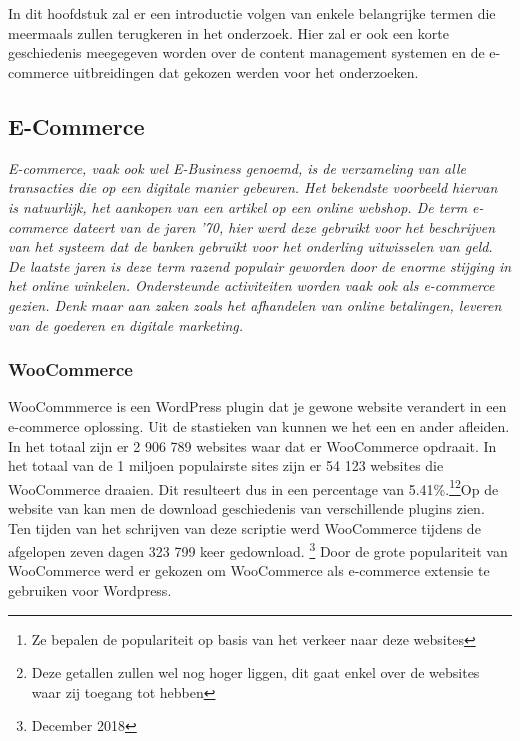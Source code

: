 \chapter{}
\label{ch:stand-van-zaken}


In dit hoofdstuk zal er een introductie volgen van enkele belangrijke termen die meermaals zullen terugkeren in het onderzoek. Hier zal er ook een korte geschiedenis meegegeven worden over de content management systemen en de e-commerce uitbreidingen dat gekozen werden voor het onderzoeken.
\section{E-Commerce}
\textit{E-commerce, vaak ook wel E-Business genoemd, is de verzameling van alle transacties die op een digitale manier gebeuren. Het bekendste voorbeeld hiervan is natuurlijk, het aankopen van een artikel op een online webshop. De term e-commerce dateert van de jaren '70, hier werd deze gebruikt voor het beschrijven van het systeem dat de banken gebruikt voor het onderling uitwisselen van geld. De laatste jaren is deze term razend populair geworden door de enorme stijging in het online winkelen. Ondersteunde activiteiten worden vaak ook als e-commerce gezien. Denk maar aan zaken zoals het afhandelen van online betalingen, leveren van de goederen en digitale marketing.} \autocite{MarketingTermen2018}
\subsection{WooCommerce}
WooCommmerce is een WordPress plugin dat je gewone website verandert in een e-commerce oplossing. Uit de stastieken van \textcite{Builtwith2018a} kunnen we het een en ander afleiden. In het totaal zijn er 2 906 789 websites waar dat er WooCommerce opdraait. In het totaal van de 1 miljoen populairste sites zijn er 54 123 websites die WooCommerce draaien. Dit resulteert dus in een percentage van 5.41\%.\footnote{Ze bepalen de populariteit op basis van het verkeer naar deze websites}\footnote{Deze getallen zullen wel nog hoger liggen, dit gaat enkel over de websites waar zij toegang tot hebben}Op de website van \textcite{Wordpress2018} kan men de download geschiedenis van verschillende plugins zien. Ten tijden van het schrijven van deze scriptie werd WooCommerce tijdens de afgelopen zeven dagen 323 799 keer gedownload. \footnote{December 2018} Door de grote populariteit van WooCommerce werd er gekozen om WooCommerce als e-commerce extensie te gebruiken voor Wordpress.
